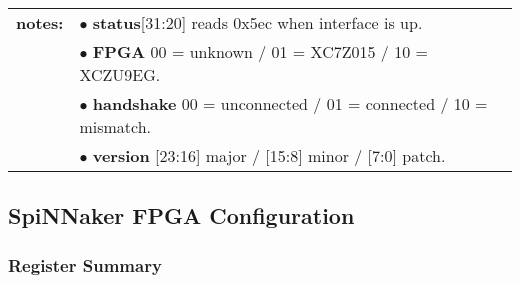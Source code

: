 \documentclass[11pt,a4paper,twoside]{article}
\begin{document}
\begin{center}
	\begin{tabularx}{\textwidth}{| l X |}
		\hline
		\textbf{notes:} & $\bullet$ \textbf{status}[31:20] reads 0x5ec when interface is up. \\%
		                & $\bullet$ \textbf{FPGA} 00 = unknown / 01 = XC7Z015 / 10 = XCZU9EG. \\%
		                & $\bullet$ \textbf{handshake} 00 = unconnected / 01 = connected / 10 = mismatch. \\%
		                & $\bullet$ \textbf{version} [23:16] major / [15:8] minor / [7:0] patch. \\%
		\hline
	\end{tabularx}
\end{center}


\clearpage
\subsection{SpiNNaker FPGA Configuration}


\subsubsection*{Register Summary}
\end{document}
